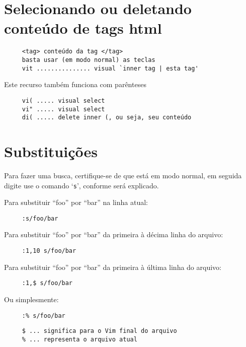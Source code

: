 \section{Selecionando ou deletando conteúdo de tags html}
\label{Selecionando ou deletando conteúdo de tags html}

\begin{verbatim}
     <tag> conteúdo da tag </tag>
     basta usar (em modo normal) as teclas
     vit ............... visual `inner tag | esta tag'
\end{verbatim}

Este recurso também funciona com parênteses

\begin{verbatim}
     vi( ..... visual select
     vi" ..... visual select
     di( ..... delete inner (, ou seja, seu conteúdo
\end{verbatim}


\section{Substituições }
\label{Substituições }

Para fazer uma busca, certifique-se de que está em modo normal, em
seguida digite use o comando `{\tt s}', conforme será explicado.

Para substituir ``foo'' por ``bar'' na linha atual:

\begin{verbatim}
     :s/foo/bar
\end{verbatim}

Para substituir ``foo'' por ``bar'' da primeira à décima linha do arquivo:

\begin{verbatim}
     :1,10 s/foo/bar
\end{verbatim}

Para substituir ``foo'' por ``bar'' da primeira à última linha do arquivo:

\begin{verbatim}
     :1,$ s/foo/bar
\end{verbatim}

Ou simplesmente:

\begin{verbatim}
     :% s/foo/bar
\end{verbatim}

\begin{verbatim}
     $ ... significa para o Vim final do arquivo
     % ... representa o arquivo atual
\end{verbatim}

